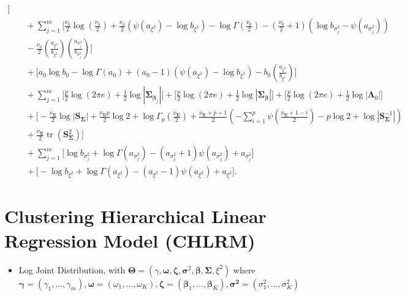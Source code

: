 \begin{appendix}
\begin{itemize}
\begin{equation}
\begin{split}
\Bigg] \\
&\quad + \sum_{j=1}^{m}\Bigg[
\tfrac{\nu_0}{2}\log\left(\tfrac{\nu_0}{2}\right)
+\tfrac{\nu_0}{2}\left(\psi(a_{\xi^2})-\log b_{\xi^2}\right)
-\log\Gamma\!\left(\tfrac{\nu_0}{2}\right) 
-\left(\tfrac{\nu_0}{2}+1\right)\left(\log b_{\sigma_j^2}-\psi(a_{\sigma_j^2})\right)\\
&\quad -\tfrac{\nu_0}{2}\left(\tfrac{a_{\xi^2}}{b_{\xi^2}}\right)\left(\tfrac{a_{\sigma_j^2}}{b_{\sigma_j^2}}\right)
\Bigg] \\
&\quad + \Bigg[
a_0\log b_0-\log\Gamma(a_0)
+(a_0-1)\left(\psi(a_{\xi^2})-\log b_{\xi^2}\right)
-b_0\left(\tfrac{a_{\xi^2}}{b_{\xi^2}}\right)
\Bigg] \\
&\quad +  \sum_{j=1}^{m}\Bigg[
\tfrac{p}{2}\log(2\pi e)+\tfrac{1}{2}\log|\bm{\Sigma}_{\bm{\beta}_j}|
\Bigg]  +\Bigg[
\tfrac{p}{2}\log(2\pi e)+\tfrac{1}{2}\log|\bm{\Sigma}_{\bm{\beta}}|
\Bigg]  + \Bigg[
\tfrac{p}{2}\log(2\pi e)+\tfrac{1}{2}\log|\bm{\Lambda}_{0}|
\Bigg] \\
&\quad +\Bigg[-\tfrac{\nu_{\bm{\Sigma}}}{2}\log|\mathbf{S}_{\bm{\Sigma}}|
+ \tfrac{\nu_{\bm{\Sigma}} p}{2}\log 2
+ \log\Gamma_p\left(\tfrac{\nu_{\bm{\Sigma}}}{2}\right) + \tfrac{\nu_{\bm{\Sigma}}+p+1}{2}\left(
-\sum_{i=1}^{p}\psi\left(\tfrac{\nu_{\bm{\Sigma}}+1-i}{2}\right)-p\log 2+\log|\mathbf{S}_{\bm{\Sigma}}^{-1}|
\right) \\ 
&\quad + \tfrac{\nu_{\bm{\Sigma}}}{2}\operatorname{tr}\left(\mathbf{S}_{\bm{\Sigma}}^2\right)\Bigg]\\
&\quad + \sum_{j=1}^{m}\Bigg[
\log b_{\sigma_j^2}+\log\Gamma(a_{\sigma_j^2})-(a_{\sigma_j^2}+1)\psi(a_{\sigma_j^2})+a_{\sigma_j^2}
\Bigg] \\
&\quad + \Bigg[
-\log b_{\xi^2}+\log\Gamma(a_{\xi^2})-(a_{\xi^2}-1)\psi(a_{\xi^2})+a_{\xi^2}
\Bigg].
\end{split}
\end{equation}

\end{itemize}

\newpage

\section{Clustering Hierarchical Linear Regression Model (CHLRM)}

\begin{itemize}

\item Log Joint Distribution, with $\bm{\Theta}=\left(\gamma, \bm{\omega}, \bm{\zeta}, \bm{\sigma}^2, \bm{\beta}, \bm{\Sigma}, \xi^2\right)$ where $\bm{\gamma}=\left(\gamma_1, \ldots, \gamma_m\right), \bm{\omega}=\left(\omega_1, \ldots, \omega_K\right), \bm{\zeta}=\left(\bm{\beta}_1, \ldots, \bm{\beta}_K\right), \bm{\sigma}^{\mathbf{2}}=\left(\sigma_1^2, \ldots, \sigma_K^2\right)$


\end{itemize}
\end{appendix}

